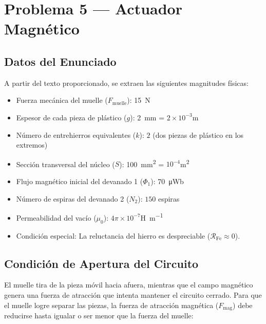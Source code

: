 \documentclass[12pt,a4paper]{article}
\begin{document}


\tableofcontents
\newpage

\section{Problema 5 --- Actuador Magnético}

\subsection{Datos del Enunciado}

A partir del texto proporcionado, se extraen las siguientes magnitudes físicas:

\begin{itemize}[nosep]
    \item Fuerza mecánica del muelle ($F_{\text{muelle}}$): \SI{15}{\newton}
    \item Espesor de cada pieza de plástico ($g$): \SI{2}{\milli\meter} = $2 \times 10^{-3}$\si{\meter}
    \item Número de entrehierros equivalentes ($k$): $2$ (dos piezas de plástico en los extremos)
    \item Sección transversal del núcleo ($S$): \SI{100}{\square\mm} = $10^{-4}$\si{\square\meter}
    \item Flujo magnético inicial del devanado 1 ($\Phi_1$): \SI{70}{\micro\weber}
    \item Número de espiras del devanado 2 ($N_2$): $150$ espiras
    \item Permeabilidad del vacío ($\mu_0$): $4\pi \times 10^{-7}$\si{\henry\per\meter}
    \item Condición especial: La reluctancia del hierro es despreciable ($\mathcal{R}_{\text{Fe}} \approx 0$).
\end{itemize}

\subsection{Condición de Apertura del Circuito}

El muelle tira de la pieza móvil hacia afuera, mientras que el campo magnético genera una fuerza de atracción que intenta mantener el circuito cerrado. Para que el muelle logre separar las piezas, la fuerza de atracción magnética ($F_{\text{mag}}$) debe reducirse hasta igualar o ser menor que la fuerza del muelle:
\end{document}
